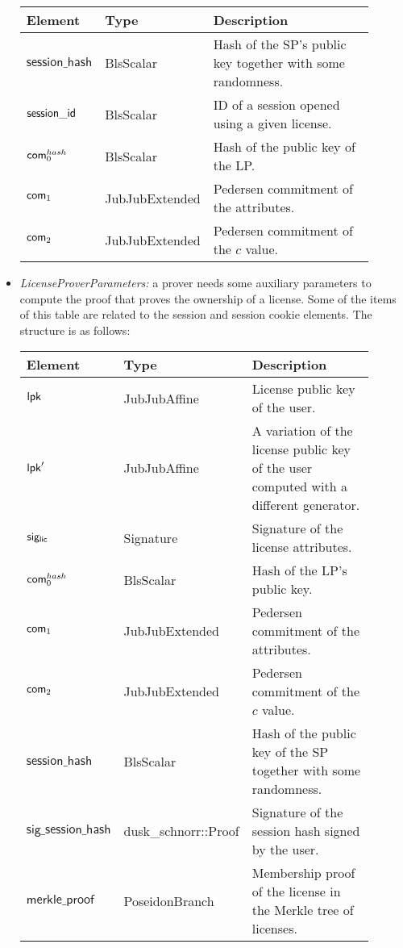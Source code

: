 \begin{itemize}
	\vspace{0.1cm}
	\begin{center}
		\begin{tabular}{ | p{0.15\linewidth} | p{0.2\linewidth} | p{0.55\linewidth} | } 
			\hline
			{Element} & {Type} & {Description} \\
			\hline
			$\mathsf{session\_hash}$ & BlsScalar & Hash of the SP's public key together with some randomness. \\ 
			$\mathsf{session\_id}$ & BlsScalar & ID of a session opened using a given license. \\ 
			$\mathsf{com}_0^{hash}$ & BlsScalar & Hash of the public key of the LP. \\ 
			$\mathsf{com}_1$ & JubJubExtended & Pedersen commitment of the attributes. \\ 
			$\mathsf{com}_2$ & JubJubExtended & Pedersen commitment of the $c$ value. \\ 
			\hline
		\end{tabular}
	\end{center}
	
    \item \emph{LicenseProverParameters:} a prover needs some auxiliary parameters to compute the proof that proves the ownership of a license. Some of the items of this table are related to the session and session cookie elements. The structure is as follows:

		
	\vspace{0.1cm}
	\begin{center}
		\begin{tabular}{ | p{0.15\linewidth} | p{0.2\linewidth} | p{0.55\linewidth} | } 
			\hline
			{Element} & {Type} & {Description} \\
			\hline
			$\mathsf{lpk}$ & JubJubAffine & License public key of the user.\\ 
			$\mathsf{lpk}'$ & JubJubAffine & A variation of the license public key of the user computed with a different generator.\\ 
			$\mathsf{sig_{lic}}$ & Signature & Signature of the license attributes. \\ 
			$\mathsf{com}_0^{hash}$ & BlsScalar & Hash of the LP's public key. \\ 
			$\mathsf{com}_1$ & JubJubExtended & Pedersen commitment of the attributes. \\ 
			$\mathsf{com}_2$ & JubJubExtended & Pedersen commitment of the $c$ value. \\ 
			$\mathsf{session\_hash}$ & BlsScalar & Hash of the public key of the SP together with some randomness. \\ 
			$\mathsf{sig\_session\_hash}$ & dusk\_schnorr::Proof & Signature of the session hash signed by the user. \\ 
			$\mathsf{merkle\_proof}$ & PoseidonBranch & Membership proof of the license in the Merkle tree of licenses. \\ 
			
			\hline
		\end{tabular}
	\end{center}
		
\end{itemize}
